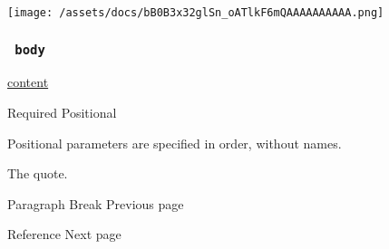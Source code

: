 \texttt{[image: /assets/docs/bB0B3x32glSn\_oATlkF6mQAAAAAAAAAA.png]}

\subsubsection{\texorpdfstring{\texttt{\ body\ }}{ body }}\label{parameters-body}

\href{/docs/reference/foundations/content/}{content}

{Required} {{ Positional }}

\label{parameters-body-positional-tooltip}
Positional parameters are specified in order, without names.

The quote.

\href{/docs/reference/model/parbreak/}{\pandocbounded{}}

{ Paragraph Break } { Previous page }

\href{/docs/reference/model/ref/}{\pandocbounded{}}

{ Reference } { Next page }


